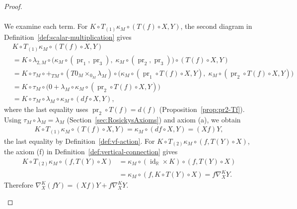 \documentclass{amsart}
\newcommand{\R}{\mathbb{R}}
\DeclareMathOperator{\pr}{pr}
\DeclareMathOperator{\id}{id}
\theoremstyle{definition}
\begin{document}
\begin{proof}
\begin{enumerate}
\begin{align*}
    \end{align*}
    We examine each term.
    For $K \circ T_{(1)} \kappa_M \circ (T(f)\circ X, Y)$,
    the second diagram in Definition~\ref{def:scalar-multiplication} gives
    \begin{align*}
      & K \circ T_{(1)} \kappa_M \circ (T(f)\circ X, Y) \\
        &= K \circ \lambda_{2, M} \circ
          \bigl(\kappa_M \circ (\pr_1, \pr_3),\; \kappa_M \circ (\pr_2, \pr_3)\bigr)
          \circ (T(f)\circ X, Y) \\
        &= K \circ \tau_M \circ {+}_{TM} \circ (T0_M \times_{0_M} \lambda_M)
          \circ \bigl(\kappa_M \circ (\pr_1 \circ T(f) \circ X, Y),\;
                 \kappa_M \circ (\pr_2 \circ T(f) \circ X, Y)\bigr) \\
        &= K \circ \tau_M \circ \bigl(0 + \lambda_M \circ \kappa_M
           \circ (\pr_2 \circ T(f) \circ X, Y)\bigr) \\
        &= K \circ \tau_M \circ \lambda_M \circ \kappa_M \circ (df \circ X, Y),
    \end{align*}
    where the last equality uses $\pr_2 \circ T(f) = d(f)$
    (Proposition~\ref{prop:pr2-Tf}).
    Using $\tau_M \circ \lambda_M = \lambda_M$
    (Section~\ref{sec:RosickysAxioms}) and axiom (a),
    we obtain
    \begin{align*}
      K \circ T_{(1)} \kappa_M \circ (T(f)\circ X, Y)
        = \kappa_M \circ (df \circ X, Y) = (Xf)Y,
    \end{align*}
    the last equality by Definition~\ref{def:vf-action}.
    For $K \circ T_{(2)} \kappa_M \circ (f, T(Y) \circ X)$,
    the axiom (f) in Definition~\ref{def:vertical-connection} gives
    \begin{align*}
     K \circ T_{(2)} \kappa_M \circ (f, T(Y) \circ X)
       &= \kappa_{M} \circ  (\id_\R \times K) \circ (f, T(Y) \circ X)\\
       &= \kappa_{M} \circ (f, K \circ T(Y) \circ X) =  f\nabla^K_X Y.
    \end{align*}
    Therefore $\nabla^K_X (fY) = (Xf)Y + f\nabla^K_X Y$.
  \end{enumerate}
\end{proof}
\end{document}
